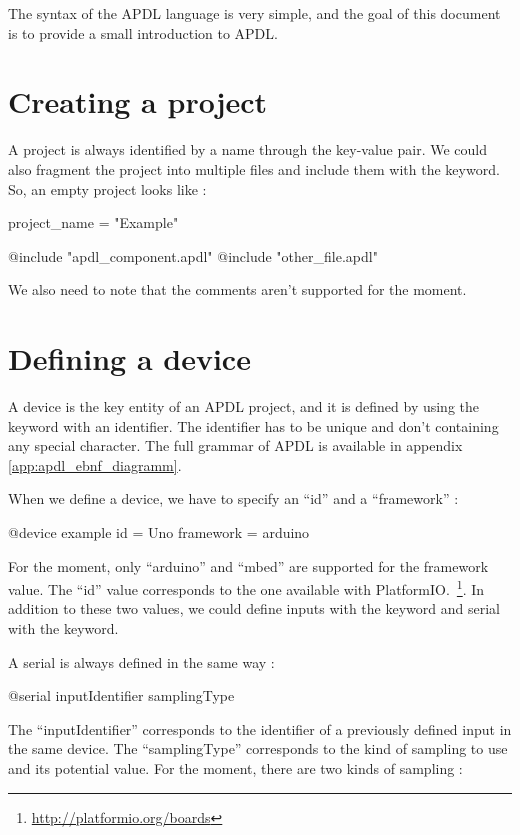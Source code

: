 The syntax of the APDL language is very simple, and the goal of this document is to
provide a small introduction to APDL.

\section*{Creating a project}

A project is always identified by a name through the 
key-value pair. We could also fragment the project into multiple files and
include them with the  keyword. So, an empty project looks
like :

\begin{apdlcode}
project_name = "Example"

@include "apdl_component.apdl"
@include "other_file.apdl"
\end{apdlcode}

We also need to note that the comments aren't supported for the moment.

\section*{Defining a device}

A device is the key entity of an APDL project, and it is defined by using the
 keyword with an identifier. The identifier has to be unique
and don't containing any special character. The full grammar of APDL is available
in appendix \ref{app:apdl_ebnf_diagramm}.

When we define a device, we have to specify an ``id'' and a ``framework'' :
\begin{apdlcode}
@device example {
  id = Uno
  framework = arduino
}
\end{apdlcode}

For the moment, only ``arduino'' and ``mbed'' are supported for the framework
value. The ``id'' value corresponds to the one available with
PlatformIO.~\footnote{\url{http://platformio.org/boards}}. In addition to these
two values, we could define inputs with the  keyword and
serial with the  keyword.

A serial is always defined in the same way :
\begin{apdlcode}
@serial inputIdentifier samplingType
\end{apdlcode}

The ``inputIdentifier'' corresponds to the identifier of a previously defined
input in the same device. The ``samplingType'' corresponds to the kind of
sampling to use and its potential value. For the moment, there are two kinds of
sampling :


